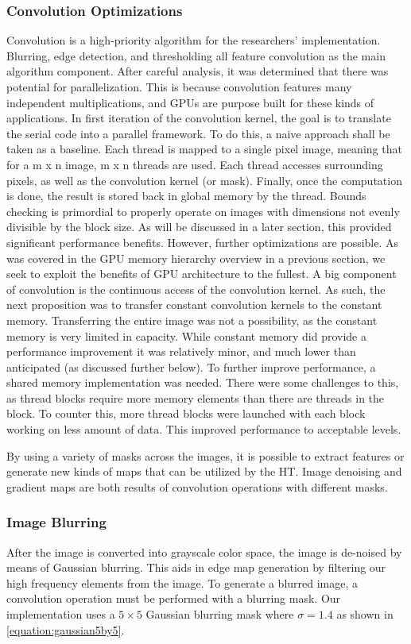 \documentclass[12pt]{article}
\begin{document}
\subsubsection*{Convolution Optimizations}
Convolution is a high-priority algorithm for the researchers' implementation.
Blurring, edge detection, and thresholding all feature convolution as the main algorithm component.
After careful analysis, it was determined that there was potential  for parallelization.
This is because convolution features many independent multiplications, and GPUs are purpose built for these kinds of applications.
In first iteration of the convolution kernel, the goal is to translate the serial code into a parallel framework.
To do this, a naive approach shall be taken as a baseline.
Each thread is mapped to a single pixel image, meaning that for a m x n image, m x n threads are used.
Each thread accesses surrounding pixels, as well as the convolution kernel (or mask).
Finally, once the computation is done, the result is stored back in global memory by the thread.
Bounds checking is primordial to properly operate on images with dimensions not evenly divisible by the block size.
As will be discussed in a later section, this provided significant performance benefits.
However, further optimizations are possible.
As was covered in the GPU memory hierarchy overview in a previous section, we seek to exploit the benefits of GPU architecture to the fullest.
A big component of convolution is the continuous access of the convolution kernel.
As such, the next proposition was to transfer constant convolution kernels to the constant memory.
Transferring the entire image was not a possibility, as the constant memory is very limited in capacity.
While constant memory did provide a performance improvement it was relatively minor, and much lower than anticipated (as discussed further below).
To further improve performance,  a shared memory implementation was needed.
There were some challenges to this, as thread blocks require more memory elements than there are threads in the block.
To counter this, more thread blocks were launched with each block working on less amount of data.
This improved performance to acceptable levels.


By using a variety of masks across the images, it is possible to extract features or generate new kinds of maps that can be utilized by the HT\@.
Image denoising and gradient maps are both results of convolution operations with different masks.

\subsubsection*{Image Blurring}
After the image is converted into grayscale color space, the image is de-noised by means of Gaussian blurring.
This aids in edge map generation by filtering our high frequency elements from the image.
To generate a blurred image, a convolution operation must be performed with a blurring mask. 
Our implementation uses a $5 \times 5$ Gaussian blurring mask where $\sigma = 1.4$ as shown in \ref{equation:gaussian5by5}.
\end{document}
